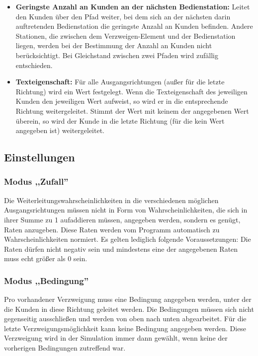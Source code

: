 \begin{itemize}
  \item 
    \textbf{Geringste Anzahl an Kunden an der nächsten Bedienstation:}
    Leitet den Kunden über den Pfad weiter, bei dem sich an der nächsten
    darin auftretenden Bedienstation die geringste Anzahl an Kunden befinden.
    Andere Stationen, die zwischen dem Verzweigen-Element und der
    Bedienstation liegen, werden bei der Bestimmung der Anzahl an Kunden
    nicht berücksichtigt. Bei Gleichstand zwischen zwei Pfaden wird
    zufällig entschieden.

  \item 
    \textbf{Texteigenschaft:}
    Für alle Ausgangsrichtungen (außer für die letzte Richtung) wird ein Wert festgelegt.
    Wenn die Texteigenschaft des jeweiligen Kunden den jeweiligen Wert aufweist,
    so wird er in die entsprechende Richtung weitergeleitet.
    Stimmt der Wert mit keinem der angegebenen Wert überein,
    so wird der Kunde in die letzte Richtung (für die kein Wert angegeben ist) weitergeleitet.

\end{itemize}

\subsection*{Einstellungen}

\subsubsection*{Modus ,,Zufall''}

Die Weiterleitungswahrscheinlichkeiten in die verschiedenen möglichen Ausgangsrichtungen müssen nicht in
Form von Wahrscheinlichkeiten, die sich in ihrer Summe zu 1 aufaddieren müssen, angegeben werden, sondern
es genügt, Raten anzugeben. Diese Raten werden vom Programm automatisch zu Wahrscheinlichkeiten normiert.
Es gelten lediglich folgende Voraussetzungen: Die Raten dürfen nicht negativ sein und mindestens eine der
angegebenen Raten muss echt größer als 0 sein.

\subsubsection*{Modus ,,Bedingung''}

Pro vorhandener Verzweigung muss eine Bedingung angegeben werden, unter der die Kunden in diese Richtung
geleitet werden. Die Bedingungen müssen sich nicht gegenseitig ausschließen und werden von oben nach unten
abgearbeitet. Für die letzte Verzweigungsmöglichkeit kann keine Bedingung angegeben werden. Diese Verzweigung
wird in der Simulation immer dann gewählt, wenn keine der vorherigen Bedingungen zutreffend war.

